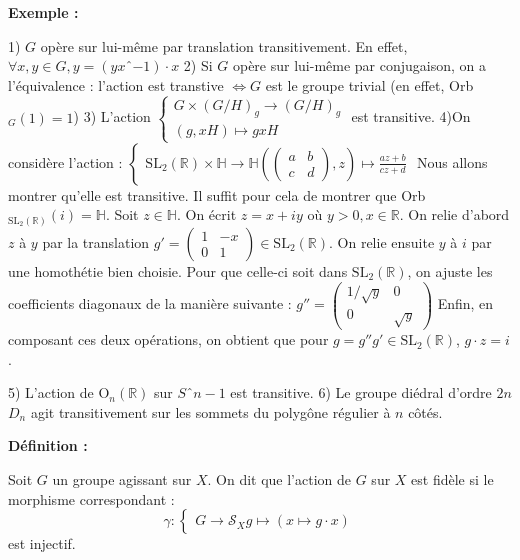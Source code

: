 \documentclass{report}
\newenvironment{definition}[1][]{
    \begin{tcolorbox}[colframe= white]
    \textbf{Définition :} 
    #1 \par
    }
    {\end{tcolorbox}}
\newenvironment{exemple}{\begin{tcolorbox}[colback=gray!10,colframe= white]
    \textbf{Exemple :}
     \par}
    {\end{tcolorbox}}
\begin{document}
\begin{exemple}
1) $G$ opère sur lui-même par translation transitivement.
En effet, $\forall x,y \in G, y = (yxˆ{-1}) \cdot x$
2) Si $G$ opère sur lui-même par conjugaison, on a l'équivalence : 
l'action est transtive $\Leftrightarrow G$ est le groupe trivial (en effet, Orb$_G (1) = {1}$)
3) L'action $\begin{cases}
G \times (G/H)_g \rightarrow (G/H)_g \\
(g, xH) \mapsto gxH
\end{cases}$ est transitive.
4)On considère l'action : $\begin{cases}
\mathrm{SL}_2 (\mathbb{R}) \times \mathbb{H}  \rightarrow \mathbb{H}
(\begin{pmatrix} 
a & b \\
c & d 
\end{pmatrix}, z) \mapsto \frac{az + b}{cz + d}
\end{cases}$
Nous allons montrer qu'elle est transitive. Il suffit pour cela de montrer que Orb$_{\mathrm{SL}_2 (\mathbb{R})} (i) = \mathbb{H}$.
Soit $z \in \mathbb{H}$. On écrit $z = x + iy$ où $y > 0, x \in \mathbb{R}$.
On relie d'abord $z$ à $y$ par la translation $g' = \begin{pmatrix} 
1 & -x \\
0 & 1 
\end{pmatrix} \in \mathrm{SL}_2 (\mathbb{R})$. On relie ensuite $y$ à $i$ par une homothétie bien choisie. Pour que celle-ci soit dans $\mathrm{SL}_2 (\mathbb{R})$, on ajuste les coefficients diagonaux de la manière suivante :
$g'' = \begin{pmatrix} 
1/\sqrt{y} & 0 \\
0 & \sqrt{y}
\end{pmatrix}$
Enfin, en composant ces deux opérations, on obtient que pour $g = g'' g' \in \mathrm{SL}_2 (\mathbb{R})$, $g\cdot z = i$.

5) L'action de O$_n (\mathbb{R})$ sur $Sˆ{n-1}$ est transitive. 
6) Le groupe diédral d'ordre $2n$ $D_n$ agit transitivement sur les sommets du polygône régulier à $n$ côtés.
\end{exemple}

\begin{definition}
Soit $G$ un groupe agissant sur $X$. 
On dit que l'action de $G$ sur $X$ est fidèle si le morphisme correspondant : 
$$\gamma : \begin{cases}
G \rightarrow \mathcal{S}_X
g \mapsto (x \mapsto g \cdot x) 
\end{cases} $$
est injectif.
\end{definition}
\end{document}
